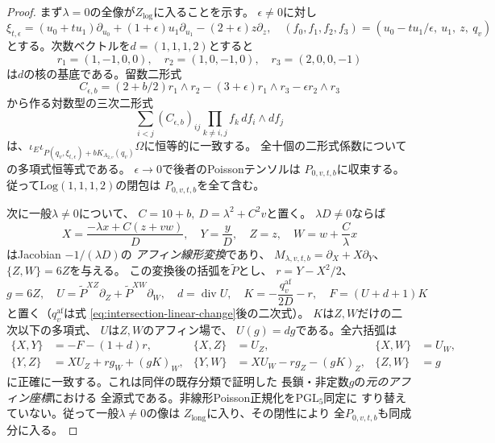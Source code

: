 \documentclass[a4paper,11pt]{ltjsarticle}
\theoremstyle{remark}\newtheorem{remark}[theorem]{注意}
\begin{document}
\begin{proof}
まず$\lambda=0$の全像が$Z_{\mathrm{log}}$に入ることを示す。
$\epsilon\ne0$に対し
\[
 \xi_{t,\epsilon}=(u_0+tu_1)\partial_{u_0}
 +(1+\epsilon)u_1\partial_{u_1}
 -(2+\epsilon)z\partial_z,\quad
 (f_0,f_1,f_2,f_3)
 =(u_0-tu_1/\epsilon,\ u_1,\ z,\ q_v)
\]
とする。次数ベクトルを$d=(1,1,1,2)$とすると
\[
 r_1=(1,-1,0,0),\quad
 r_2=(1,0,-1,0),\quad
 r_3=(2,0,0,-1)
\]
は$d$の核の基底である。留数二形式
\[
 C_{\epsilon,b}=(2+b/2)r_1\wedge r_2
 -(3+\epsilon)r_1\wedge r_3
 -\epsilon r_2\wedge r_3
\]
から作る対数型の三次二形式
\begin{equation}\label{eq:intersection-log-source}
 \sum_{i<j}(C_{\epsilon,b})_{ij}
       \prod_{k\ne i,j}f_k\,df_i\wedge df_j
\end{equation}
は、$\iota_E\iota_{P(q_v,\xi_{t,\epsilon})
          +bK_{A_{2,v}}(q_v)}\Omega$に恒等的に一致する。
全十個の二形式係数についての多項式恒等式である。
$\epsilon\to0$で後者のPoissonテンソルは
$P_{0,v,t,b}$に収束する。
従って$\mathrm{Log}(1,1,1,2)$の閉包は
$P_{0,v,t,b}$を全て含む。

次に一般$\lambda\ne0$について、
$C=10+b,\ D=\lambda^2+C^2v$と置く。
$\lambda D\ne0$ならば
\begin{equation}\label{eq:intersection-linear-change}
 X=\frac{-\lambda x+C(z+vw)}D,\quad
 Y=\frac yD,\quad Z=z,\quad
 W=w+\frac C\lambda x
\end{equation}
はJacobian $-1/(\lambda D)$の
\emph{アフィン線形変換}であり、
$M_{\lambda,v,t,b}=\partial_X+X\partial_Y$、
$\{Z,W\}=6Z$を与える。
この変換後の括弧を$\widetilde P$とし、
$r=Y-X^2/2$、
\[
 g=6Z,\quad
 U=\widetilde P^{XZ}\partial_Z
    +\widetilde P^{XW}\partial_W,\quad
 d=\operatorname{div}U,\quad
 K=-\frac{q_v^{\mathrm{af}}}{2D}-r,\quad
 F=(U+d+1)K
\]
と置く（$q_v^{\mathrm{af}}$は式
\eqref{eq:intersection-linear-change}後の二次式）。
$K$は$Z,W$だけの二次以下の多項式、
$U$は$Z,W$のアフィン場で、
$U(g)=dg$である。全六括弧は
\[
\begin{aligned}
 \{X,Y\}&=-F-(1+d)r,&
 \{X,Z\}&=U_Z,& \{X,W\}&=U_W,\\
 \{Y,Z\}&=XU_Z+r g_W+(gK)_W,&
 \{Y,W\}&=XU_W-rg_Z-(gK)_Z,&
 \{Z,W\}&=g
\end{aligned}
\]
に正確に一致する。これは同伴の既存分類で証明した
長鎖・非定数$g$の\emph{元のアフィン座標}における
全源式である。非線形Poisson正規化を$\mathrm{PGL}_5$同定に
すり替えていない。従って一般$\lambda\ne0$の像は
$Z_{\mathrm{long}}$に入り、その閉性により
全$P_{0,v,t,b}$も同成分に入る。


\end{proof}
\end{document}
